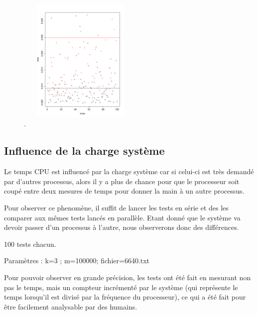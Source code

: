 \begin{figure}[htbp]
	\begin{center}
		\includegraphics[width=6cm,height=6cm]{diagrams/time_serial_paral.pdf}
		\caption{.}
		\label{fig:timeStochasticite}
	\end{center}
\end{figure}

\subsection{Influence de la charge système}

Le temps CPU est influencé par la charge système car si celui-ci est très demandé par d'autres processus, alors il y a plus de chance pour que le processeur soit coupé entre deux mesures de temps pour donner la main à un autre processus.

Pour observer ce phenomène, il suffit de lancer les tests en série et des les comparer aux mêmes tests lancés en parallèle.
Etant donné que le système va devoir passer d'un processus à l'autre, nous observerons donc des différences.

100 tests chacun.

Paramètres : k=3 ; m=100000; fichier=6640.txt

Pour pouvoir observer en grande précision, les tests ont été fait en mesurant non pas le temps, mais un compteur incrémenté par le système (qui représente le temps lorsqu'il est divisé par la fréquence du processeur), ce qui a été fait pour être facilement analysable par des humains.

